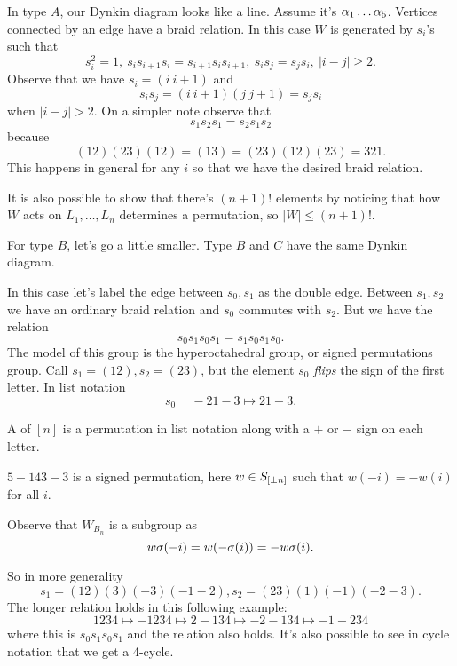 \documentclass[12pt]{memoir}
\begin{document}
\begin{Ex}
    In type $A$, our Dynkin diagram looks like a line. Assume it's $\alpha_1\dots\alpha_5$. Vertices connected by an edge have a braid relation. In this case $W$ is generated by $s_i$'s such that 
    $$s_i^2=1,\ s_is_{i+1}s_i=s_{i+1}s_is_{i+1},\ s_is_j=s_js_i,\ |i-j|\geq 2.$$
    Observe that we have $s_i=(i\ i+1)$ and 
    $$s_is_j=(i\ i+1)(j\ j+1)=s_js_i$$
    when $|i-j|>2$. On a simpler note observe that 
    $$s_1s_2s_1=s_2s_1s_2$$
    because 
    $$(12)(23)(12)=(13)=(23)(12)(23)=321.$$
    This happens in general for any $i$ so that we have the desired braid relation.\par
    It is also possible to show that there's $(n+1)!$ elements by noticing that how $W$ acts on $L_1,\dots,L_n$ determines a permutation, so $|W|\leq (n+1)!$.
 \end{Ex}

 For type $B$, let's go a little smaller. Type $B$ and $C$ have the same Dynkin diagram.

 \begin{Ex}
    In this case let's label the edge between $s_0,s_1$ as the double edge. Between $s_1,s_2$ we have an ordinary braid relation and $s_0$ commutes with $s_2$. But we have the relation 
    $$s_0s_1s_0s_1=s_1s_0s_1s_0.$$
    The model of this group is the hyperoctahedral group, or signed permutations group. Call $s_1=(12),s_2=(23)$, but the element $s_0$ \emph{flips} the sign of the first letter. In list notation
    $$s_0\:\quad -21-3\mapsto 21-3.$$
 \end{Ex}

 \begin{Def}
    A  of $[n]$ is a permutation in list notation along with a $+$ or $-$ sign on each letter.
 \end{Def}

 \begin{Ex}
    $5-143-3$ is a signed permutation, here $w\in S_{\left\lbrack\pm n\right\rbrack}$ such that $w(-i)=-w(i)$ for all $i$.
 \end{Ex}

 Observe that $W_{B_{n}}$ is a subgroup as 
 $$w\sigma(-i)=w(-\sigma(i))=-w\sigma(i).$$

 So in more generality 
 $$s_1=(12)(3)(-3)(-1-2),s_2=(23)(1)(-1)(-2-3).$$
The longer relation holds in this following example:
$$1234\mapsto -1234\mapsto 2-134\mapsto -2-134\mapsto -1-234$$
where this is $s_0s_1s_0s_1$ and the relation also holds. It's also possible to see in cycle notation that we get a 4-cycle.
\end{document}
